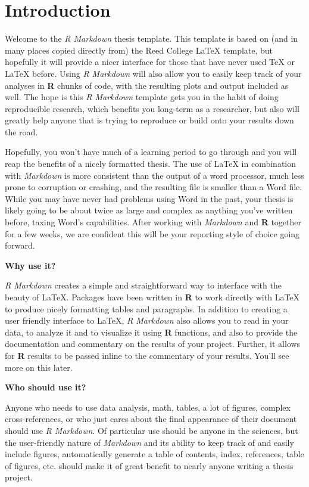 \documentclass[12pt,twoside]{reedthesis}
\begin{document}
\hypertarget{introduction}{%
\chapter*{Introduction}\label{introduction}}

Welcome to the \emph{R Markdown} thesis template. This template is based on (and in many places copied directly from) the Reed College LaTeX template, but hopefully it will provide a nicer interface for those that have never used TeX or LaTeX before. Using \emph{R Markdown} will also allow you to easily keep track of your analyses in \textbf{R} chunks of code, with the resulting plots and output included as well. The hope is this \emph{R Markdown} template gets you in the habit of doing reproducible research, which benefits you long-term as a researcher, but also will greatly help anyone that is trying to reproduce or build onto your results down the road.

Hopefully, you won't have much of a learning period to go through and you will reap the benefits of a nicely formatted thesis. The use of LaTeX in combination with \emph{Markdown} is more consistent than the output of a word processor, much less prone to corruption or crashing, and the resulting file is smaller than a Word file. While you may have never had problems using Word in the past, your thesis is likely going to be about twice as large and complex as anything you've written before, taxing Word's capabilities. After working with \emph{Markdown} and \textbf{R} together for a few weeks, we are confident this will be your reporting style of choice going forward.

\textbf{Why use it?}

\emph{R Markdown} creates a simple and straightforward way to interface with the beauty of LaTeX. Packages have been written in \textbf{R} to work directly with LaTeX to produce nicely formatting tables and paragraphs. In addition to creating a user friendly interface to LaTeX, \emph{R Markdown} also allows you to read in your data, to analyze it and to visualize it using \textbf{R} functions, and also to provide the documentation and commentary on the results of your project. Further, it allows for \textbf{R} results to be passed inline to the commentary of your results. You'll see more on this later.

\textbf{Who should use it?}

Anyone who needs to use data analysis, math, tables, a lot of figures, complex cross-references, or who just cares about the final appearance of their document should use \emph{R Markdown}. Of particular use should be anyone in the sciences, but the user-friendly nature of \emph{Markdown} and its ability to keep track of and easily include figures, automatically generate a table of contents, index, references, table of figures, etc. should make it of great benefit to nearly anyone writing a thesis project.
\end{document}
